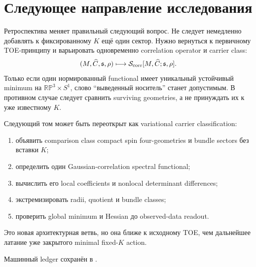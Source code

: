 \section{Следующее направление исследования}

Ретроспектива меняет правильный следующий вопрос. Не следует немедленно
добавлять к фиксированному \(K\) ещё один сектор. Нужно вернуться к
первичному TOE-принципу и варьировать одновременно correlation operator и
carrier class:
\begin{equation}
 (M,\widehat C,\mathfrak s,\rho)
 \longmapsto
 \mathcal S_{\rm corr}[M,\widehat C;\mathfrak s,\rho].
\end{equation}
Только если один нормированный functional имеет уникальный устойчивый
minimum на \(\mathbb{RP}^3\times S^1\), слово ``выведенный носитель'' станет
допустимым. В противном случае следует сравнить surviving geometries, а не
принуждать их к уже известному \(K\).

\begin{protocol}
Следующий том может быть переоткрыт как variational carrier classification:
\begin{enumerate}
 \item объявить comparison class compact spin four-geometries и bundle
 sectors без вставки \(K\);
 \item определить один Gaussian-correlation spectral functional;
 \item вычислить его local coefficients и nonlocal determinant differences;
 \item экстремизировать radii, quotient и bundle classes;
 \item проверить global minimum и Hessian до observed-data readout.
\end{enumerate}
Это новая архитектурная ветвь, но она ближе к исходному TOE, чем дальнейшее
латание уже закрытого minimal fixed-\(K\) action.
\end{protocol}

Машинный ledger сохранён в
.